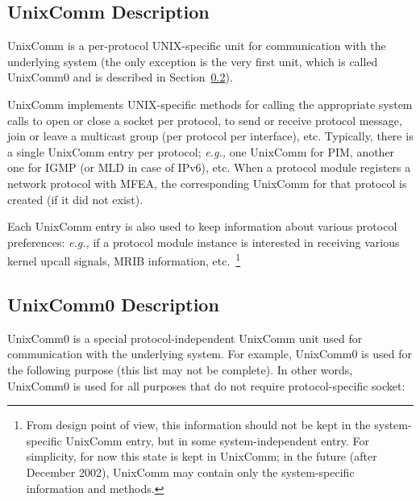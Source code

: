 \documentclass[11pt]{article}
\newcommand{\eg}{\emph{e.g.,}\xspace}
\begin{document}
\subsection{UnixComm Description}

UnixComm is a per-protocol UNIX-specific unit for communication with the
underlying system (the only exception is the very first unit, which is
called UnixComm0 and is described in
Section~\ref{sec:unixcomm0_description}).

UnixComm implements UNIX-specific methods for calling the appropriate
system calls to open or close a socket per protocol, to send or receive
protocol message, join or leave a multicast group (per protocol per
interface), etc. Typically, there is a single UnixComm entry per
protocol; \eg one UnixComm for PIM, another one for IGMP (or MLD in case
of IPv6), etc. When a protocol module registers a network protocol with
MFEA, the corresponding UnixComm for that protocol is created (if it did
not exist).

Each UnixComm entry is also used to keep information about various
protocol preferences: \eg if a protocol module instance is interested in
receiving various kernel upcall signals, MRIB information,
etc.~\footnote{From design point of view, this information should not be
kept in the system-specific UnixComm entry, but in some
system-independent entry. For simplicity, for now this state is
kept in UnixComm; in the future (after December 2002), UnixComm
may contain only the system-specific information and methods.}

\subsection{UnixComm0 Description}
\label{sec:unixcomm0_description}

UnixComm0 is a special protocol-independent UnixComm unit used for
communication with the underlying system. For example, UnixComm0 is used
for the following purpose (this list may not be complete). In other
words, UnixComm0 is used for all purposes that do not require
protocol-specific socket:
\end{document}
